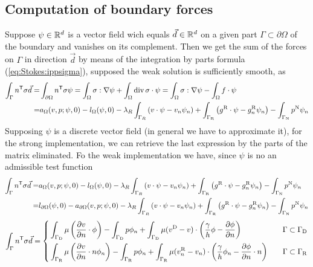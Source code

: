 \subsection{Computation of boundary forces}\label{subsec:}
%
Suppose $\psi\in\mathbb R^d$ is a vector field wich equals $\vec{d}\in\mathbb R^d$ on a given part $\Gamma\subset\partial\Omega$ of the boundary and vanishes on its complement. Then we get the sum of the forces on $\Gamma$ in direction $\vec{d}$ by means of the integration by parts formula (\ref{eq:Stokes:ippsigma}), supposed the weak solution is sufficiently smooth, as
%
\begin{align*}
\int_{\Gamma} {n}^{\mathsf{T}}\sigma \vec{d} =& \int_{\partial\Omega} {n}^{\mathsf{T}}\sigma \psi
=\int_{\Omega} \sigma:\nabla\psi  + \int_{\Omega} \operatorname{div} \sigma\cdot \psi
=\int_{\Omega} \sigma:\nabla\psi  -\int_{\Omega} f\cdot \psi\\
=& a_{\Omega}(v,p; \psi,0) - l_{\Omega}(\psi,0) - \lambda_R\int_{\Gamma_R}\left(v\cdot\psi - v_n\psi_n\right)+ \int_{\Gamma_{\rm R}}\left(g^{\rm R}\cdot\psi - g^{\rm R}_n\psi_n\right)
 -\int_{\Gamma_{\rm N}}p^{\rm N} \psi_n
\end{align*}
%
Supposing $\psi$ is a discrete vector field (in general we have to approximate it), for the strong implementation, we can retrieve the last expression by the parts of the matrix eliminated.
Fo the weak implementation we have, since $\psi$ is no an admissible test function
%
\begin{align*}
\int_{\Gamma} {n}^{\mathsf{T}}\sigma \vec{d} =&a_{\Omega}(v,p; \psi,0) - l_{\Omega}(\psi,0) - \lambda_R\int_{\Gamma_R}\left(v\cdot\psi - v_n\psi_n\right)+ \int_{\Gamma_{\rm R}}\left(g^{\rm R}\cdot\psi - g^{\rm R}_n\psi_n\right)
 -\int_{\Gamma_{\rm N}}p^{\rm N} \psi_n\\
=&  l_{\partial\Omega}(\psi,0) - a_{\partial\Omega}(v,p; \psi,0) - \lambda_R\int_{\Gamma_R}\left(v\cdot\psi - v_n\psi_n\right)+ \int_{\Gamma_{\rm R}}\left(g^{\rm R}\cdot\psi - g^{\rm R}_n\psi_n\right)
 -\int_{\Gamma_{\rm N}}p^{\rm N} \psi_n
\end{align*}
%
%
\begin{equation}\label{eq:}
%
\int_{\Gamma} \transpose{n}\sigma \vec{d} =
\left\{
\begin{aligned}
& 
 \int_{\GammaD}\mu \left(  \dn{v}\cdot  \phi \right)
- \int_{\GammaD}  p\phi_n 
+\int_{\GammaD}\mu(\vD-v)\cdot\left( \frac{\gamma}{h}\phi - \dn{\phi}\right)
&\quad \Gamma\subset\GammaD\\ 
& 
 \int_{\GammaR} \mu\left( \dn{v}\cdot n \phi_n \right)
- \int_{\GammaR} p\phi_n  
+\int_{\GammaR}\mu(\vn-v_n)\cdot\left( \frac{\gamma}{h}\phi_n - \dn{\phi}\cdot n\right)
&\quad \Gamma\subset\GammaR
\end{aligned}
\right.
%
\end{equation}
% 
%
